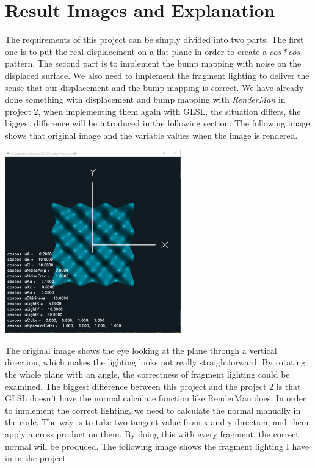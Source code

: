 \documentclass[letterpaper,14pt,titlepage,fleqn]{article}
\begin{document}
\section{Result Images and Explanation}
The requirements of this project can be simply divided into two parts. The first one is to put the real displacement on a flat plane in order to create a $cos*cos$ pattern. The second part is to implement the bump mapping with noise on the displaced surface. We also need to implement the fragment lighting to deliver the sense that our displacement and the bump mapping is correct. We have already done something with displacement and bump mapping with \textit{RenderMan} in project 2, when implementing them again with GLSL, the situation differs, the biggest difference will be introduced in the following section. The following image shows that original image and the variable values when the image is rendered. 
\begin{center}
	\includegraphics[width=3in]{origin.jpg}
\end{center}
The original image shows the eye looking at the plane through a vertical direction, which makes the lighting looks not really straightforward. By rotating the whole plane with an angle, the correctness of fragment lighting could be examined. The biggest difference between this project and the project 2 is that GLSL doesn't have the  normal calculate function like RenderMan does. In order to implement the correct lighting, we need to calculate the normal manually in the code. The way is to take two tangent value from x and y direction, and them apply a cross product on them. By doing this with every fragment, the correct normal will be produced. The following image shows the fragment lighting I have in in the project.
\end{document}
